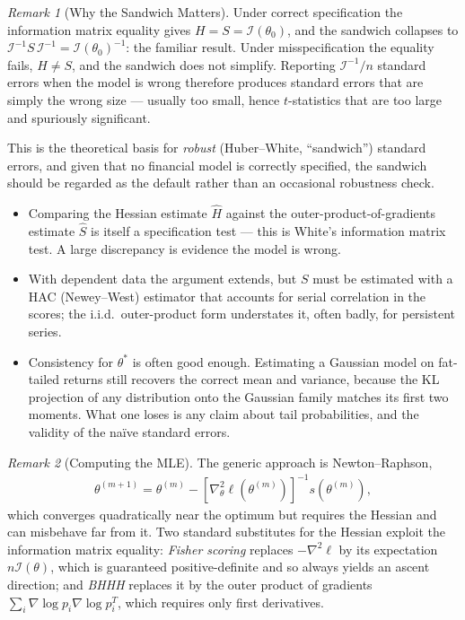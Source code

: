 \documentclass[11pt]{article}
\theoremstyle{definition}
\theoremstyle{plain}
\theoremstyle{remark}
\newtheorem{remark}{Remark}[section]
\begin{document}
\begin{remark}[Why the Sandwich Matters]
    Under correct specification the information matrix equality gives $H = S = \mathcal{I}(\theta_0)$, and the sandwich collapses to $\mathcal{I}^{-1}S\,\mathcal{I}^{-1} = \mathcal{I}(\theta_0)^{-1}$: the familiar result. Under misspecification the equality fails, $H \neq S$, and the sandwich does not simplify. Reporting $\mathcal{I}^{-1}/n$ standard errors when the model is wrong therefore produces standard errors that are simply the wrong size --- usually too small, hence $t$-statistics that are too large and spuriously significant.

    This is the theoretical basis for \emph{robust} (Huber--White, ``sandwich'') standard errors, and given that no financial model is correctly specified, the sandwich should be regarded as the default rather than an occasional robustness check.
    \begin{itemize}[noitemsep]
        \item Comparing the Hessian estimate $\hat{H}$ against the outer-product-of-gradients estimate $\hat{S}$ is itself a specification test --- this is White's information matrix test. A large discrepancy is evidence the model is wrong.
        \item With dependent data the argument extends, but $S$ must be estimated with a HAC (Newey--West) estimator that accounts for serial correlation in the scores; the i.i.d.\ outer-product form understates it, often badly, for persistent series.
        \item Consistency for $\theta^*$ is often good enough. Estimating a Gaussian model on fat-tailed returns still recovers the correct mean and variance, because the KL projection of any distribution onto the Gaussian family matches its first two moments. What one loses is any claim about tail probabilities, and the validity of the na\"ive standard errors.
    \end{itemize}
\end{remark}

\begin{remark}[Computing the MLE]
    The generic approach is Newton--Raphson,
    \begin{align}
        \theta^{(m+1)} = \theta^{(m)} - \left[\nabla^2_\theta \ell(\theta^{(m)})\right]^{-1} s(\theta^{(m)}),
    \end{align}
    which converges quadratically near the optimum but requires the Hessian and can misbehave far from it. Two standard substitutes for the Hessian exploit the information matrix equality: \emph{Fisher scoring} replaces $-\nabla^2\ell$ by its expectation $n\mathcal{I}(\theta)$, which is guaranteed positive-definite and so always yields an ascent direction; and \emph{BHHH} replaces it by the outer product of gradients $\sum_i \nabla\log p_i \nabla\log p_i^T$, which requires only first derivatives.
\end{remark}
\end{document}
